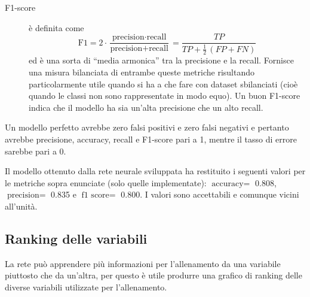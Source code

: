 \begin{description}
        \item[F1-score] è definita come
        \begin{equation}
            \text{F1} = 2 \cdot \frac{\text{precision} \cdot \text{recall}}{\text{precision} + \text{recall}} = \frac{TP}{TP + \frac{1}{2}\,(FP + FN)}
        \end{equation}
        ed è una sorta di ``media armonica'' tra la precisione e la recall. Fornisce una misura bilanciata di entrambe queste metriche risultando particolarmente utile quando si ha a che fare con dataset sbilanciati (cioè quando le classi non sono rappresentate in modo equo). Un buon F1-score indica che il modello ha sia un'alta precisione che un alto recall.
    \end{description}

    Un modello perfetto avrebbe zero falsi positivi e zero falsi negativi e pertanto avrebbe precisione, accuracy, recall e F1-score pari a 1, mentre il tasso di errore sarebbe pari a 0.
    
    Il modello ottenuto dalla rete neurale sviluppata ha restituito i seguenti valori per le metriche sopra enunciate (solo quelle implementate): $\text{accuracy}  =$ \num{0.808}, $\text{precision} =$ \num{0.835} e $\text{f1 score}  =$ \num{0.800}. I valori sono accettabili e comunque vicini all'unità.

\newpage

    \subsection{Ranking delle variabili}
        La rete può apprendere più informazioni per l'allenamento da una variabile piuttosto che da un'altra, per questo è utile produrre una grafico di ranking delle diverse variabili utilizzate per l'allenamento.
        
